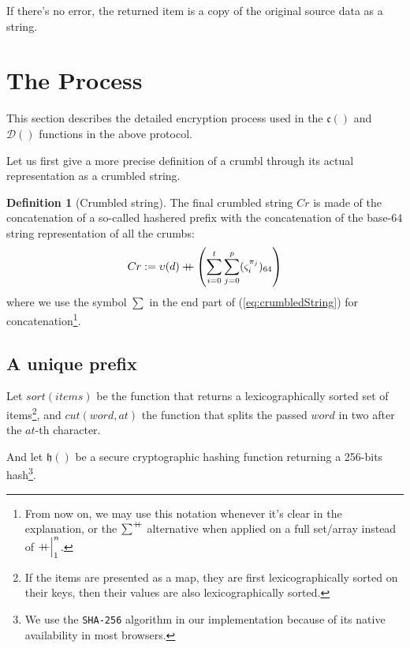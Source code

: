 \documentclass[twoside,twocolumn]{article}
\newcommand{\concat}{\mathbin{{+}\mspace{-8mu}{+}}}
\theoremstyle{definition}
\newtheorem{definition}{Definition}
\theoremstyle{remark}
\begin{document}
\vspace{1em} %

If there's no error, the returned item is a copy of the original source data as a string.


\section{The Process}

This section describes the detailed encryption process used in the $\mathfrak{c}()$ and $\mathcal{D}()$ functions in the above protocol.

Let us first give a more precise definition of a crumbl through its actual representation as a crumbled string.
\begin{definition}[Crumbled string]
    \label{crumbledString}
    The final crumbled string $Cr$ is made of the concatenation of a so-called hashered prefix with the concatenation of the base-64 string 
    representation of all the crumbs:
    \begin{equation}
        \label{eq:crumbledString}
        Cr := \upsilon(d) \concat \left( \sum_{i=0}^t \sum_{j=0}^p (\varsigma_i^{\pi_j})_{64} \right)
    \end{equation}
    where we use the symbol $\sum$ in the end part of (\ref{eq:crumbledString}) for concatenation\footnote{From now on, we may use this notation 
    whenever it's clear in the explanation, or the $\sum^{\concat}$ alternative when applied on a full set/array instead of $\concat {\Big|}_1^n$.}.
\end{definition}

\subsection{A unique prefix}

Let $sort(items)$ be the function that returns a lexicographically sorted set of items\footnote{
    If the items are presented as a map, they are first lexicographically sorted on their keys, then their values are also lexicographically sorted.
}, and $cut(word, at)$ the function that splits the passed $word$ in two after the $at$-th character.

And let $\mathfrak{h}()$ be a secure cryptographic hashing function returning a 256-bits hash\footnote{We use the \texttt{SHA-256} algorithm in our 
implementation because of its native availability in most browsers.}.
\end{document}
